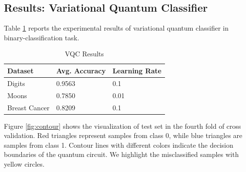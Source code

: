 \documentclass[sigconf]{acmart}
\begin{document}
\subsection{Results: Variational Quantum Classifier}
Table \ref{tab:vqc-results} reports the experimental results of variational quantum classifier in binary-classification task.

\begin{table}[!ht]
    \centering
    \caption{VQC Results}
    \label{tab:vqc-results}
    \begin{tabular}{lll}
        \toprule
        \textbf{Dataset} & \textbf{Avg. Accuracy} & \textbf{Learning Rate}\\
        \midrule
        Digits & 0.9563 & 0.1\\
        Moons & 0.7850 & 0.01\\
        Breast Cancer & 0.8209 & 0.1\\
        \bottomrule
    \end{tabular}
\end{table}

Figure \ref{fig:contour} shows the visualization of test set in the fourth fold of cross validation. Red triangles represent samples from class 0, while blue triangles are samples from class 1. Contour lines with different colors indicate the decision boundaries of the quantum circuit. We highlight the misclassified samples with yellow circles.
\end{document}
